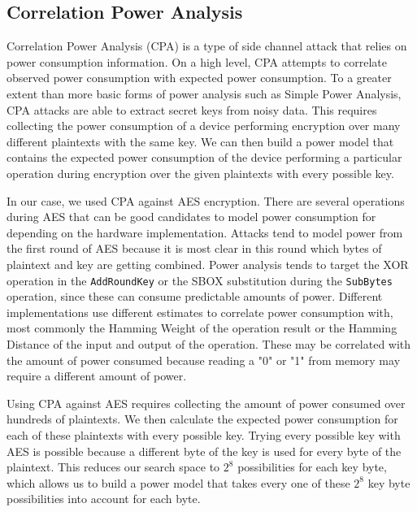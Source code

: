 \documentclass[journal]{ieee_style}
\begin{document}
\subsection{Correlation Power Analysis}
Correlation Power Analysis (CPA) is a type of side channel attack that relies on power consumption information. On a high level, CPA attempts to correlate observed power consumption with expected power consumption. To a greater extent than more basic forms of power analysis such as Simple Power Analysis, CPA attacks are able to extract secret keys from noisy data. This requires collecting the power consumption of a device performing encryption over many different plaintexts with the same key. We can then build a power model that contains the expected power consumption of the device performing a particular operation during encryption over the given plaintexts with every possible key. 

In our case, we used CPA against AES encryption. There are several operations during AES that can be good candidates to model power consumption for depending on the hardware implementation. Attacks tend to model power from the first round of AES because it is most clear in this round which bytes of plaintext and key are getting combined. Power analysis tends to target the XOR operation in the \texttt{AddRoundKey} or the SBOX substitution during the \texttt{SubBytes} operation, since these can consume predictable amounts of power. Different implementations use different estimates to correlate power consumption with, most commonly the Hamming Weight of the operation result or the Hamming Distance of the input and output of the operation. These may be correlated with the amount of power consumed because reading a "0" or "1" from memory may require a different amount of power.
 
Using CPA against AES requires collecting the amount of power consumed over hundreds of plaintexts. We then calculate the expected power consumption for each of these plaintexts with every possible key. Trying every possible key with AES is possible because a different byte of the key is used for every byte of the plaintext. This reduces our search space to $2^8$ possibilities for each key byte, which allows us to build a power model that takes every one of these $2^8$ key byte possibilities into account for each byte. 
\end{document}
